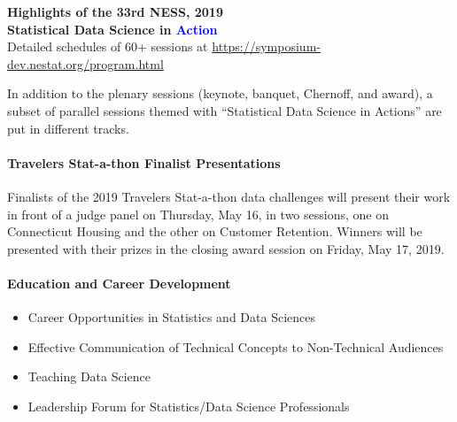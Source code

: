 \documentclass[12pt]{article}
\newcommand{\blue}[1]{{\textcolor{blue}{#1}}}
\begin{document}
\newpage

\begin{center}
  {\bf\LARGE Highlights of the 33rd NESS, 2019\\[1ex]
    Statistical Data Science in \blue{\Huge Action}}\\[1ex]
  Detailed schedules of 60+ sessions at \url{https://symposium-dev.nestat.org/program.html}
\end{center}

In addition to the plenary sessions (keynote, banquet, Chernoff, and
award), a subset of parallel sessions themed with ``Statistical Data
Science in Actions'' are put in different tracks.

\paragraph{Travelers Stat-a-thon Finalist Presentations}
Finalists of the 2019 Travelers Stat-a-thon data challenges will
present their work in front of a judge panel on Thursday, May 16, in
two sessions, one on Connecticut Housing and the other on Customer
Retention. Winners will be presented with their prizes in the closing
award session on Friday, May 17, 2019.

\paragraph{Education and Career Development}
\begin{itemize}
\item
  Career Opportunities in Statistics and Data
  Sciences
\item
  Effective Communication of Technical
  Concepts to Non-Technical Audiences
\item
  Teaching Data Science
\item
  Leadership Forum for Statistics/Data Science Professionals
\end{itemize}
\end{document}
